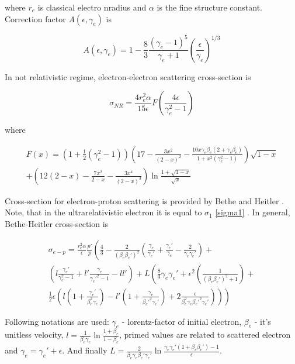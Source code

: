 where $r_e$ is classical electro nradius and $\alpha$ is the fine structure constant. Correction factor $A(\epsilon, \gamma_e)$ is

\begin{equation}
	A\left(\epsilon, \gamma_e\right)=1-\frac{8}{3}\frac{\left(\gamma_e-1\right)^5}{\gamma_e + 1}\left(\frac{\epsilon}{\gamma_e}\right)^{1/3}
\end{equation}

In not relativistic regime, electron-electron scattering cross-section is 

\begin{equation}
	\sigma_{NR}=\frac{4r_e^2\alpha}{15\epsilon}F\left(\frac{4\epsilon}{\gamma_e^2-1}\right)
\end{equation}

where

\begin{equation}
	\begin{split}
	F(x) = \left(1+\frac{1}{2}\left(\gamma_e^2-1\right)\right)\left(17-\frac{3x^2}{\left(2-x\right)^2}-\frac{10x\gamma_e\beta_e\left(2+\gamma_e\beta_e\right)}{1+x^2\left(\gamma_e^2-1\right)}\right)\sqrt{1-x} \\ +\left(12\left(2-x\right)-\frac{7x^2}{2-x}-\frac{3x^4}{\left(2-x\right)^3}\right)\ln\frac{1+\sqrt{1-x}}{\sqrt{x}}
	\end{split}
\end{equation}

Cross-section for electron-proton scattering is provided by Bethe and Heitler \cite{BetheHeitler}. Note, that in the ultrarelativistic electron it is equal to $\sigma_1$ \ref{sigma1} \cite{JauchRohrlich}. In general, Bethe-Heitler cross-section is

\begin{equation}
	\begin{split}
	\sigma_{e-p} = \frac{r_e^2\alpha}{\epsilon}\frac{p'}{p}\left(\frac{4}{3}-\frac{2}{\left(\beta_e\beta_e'\right)^2}\left(\frac{\gamma_e}{\gamma_e'}+\frac{\gamma_e'}{\gamma_e}-\frac{2}{\gamma_e\gamma_e'}\right) + \right. \\ \left. \left(l\frac{\gamma_e'}{\gamma_e^2-1}+l'\frac{\gamma_e}{\gamma_e'^2-1}-l l'\right) + L\left(\frac{8}{3}\gamma_e\gamma_e'+\epsilon^2\left(\frac{1}{\left(\beta_e\beta_e'\right)^2+1}\right)+ \right. \right. \\ \left. \left. \frac{1}{2}\epsilon\left(l\left(1+\frac{\gamma_e'}{\beta_e^2\gamma_e}\right)-l'\left(1+\frac{\gamma_e}{\beta_e'^2\gamma_e'}\right)+2\frac{\epsilon}{\beta_e^2\gamma_e\beta_e'^2\gamma_e'}\right)\right)\right)
	\end{split}
\end{equation}

Following notations are used: $\gamma_e$ - lorentz-factor of initial electron, $\beta_e$ - it's unitless velocity, $l = \frac{1}{\beta_e\gamma_e}\ln\frac{1+\beta_e}{1-\beta_e}$, primed values are related to scattered electron and $\gamma_e = \gamma_e' + \epsilon$. And finally $L = \frac{2}{\beta_e\gamma_e\beta_e'\gamma_e'}\ln\frac{\gamma_e\gamma_e'\left(1+\beta_e\beta_e'\right)-1}{\epsilon}$.
